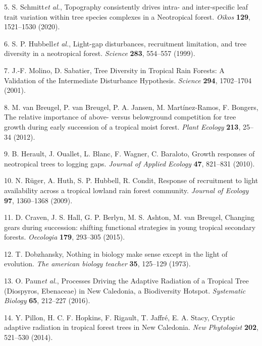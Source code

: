 \documentclass[
]{article}
\begin{document}
\leavevmode\hypertarget{ref-Schmitt2020}{}%
5. S. Schmitt\emph{et al.}, Topography consistently drives intra- and inter-specific leaf trait variation within tree species complexes in a Neotropical forest. \emph{Oikos} \textbf{129}, 1521--1530 (2020).

\leavevmode\hypertarget{ref-Hubbell1999}{}%
6. S. P. Hubbell\emph{et al.}, Light-gap disturbances, recruitment limitation, and tree diversity in a neotropical forest. \emph{Science} \textbf{283}, 554--557 (1999).

\leavevmode\hypertarget{ref-Molino2001}{}%
7. J.-F. Molino, D. Sabatier, Tree Diversity in Tropical Rain Forests: A Validation of the Intermediate Disturbance Hypothesis. \emph{Science} \textbf{294}, 1702--1704 (2001).

\leavevmode\hypertarget{ref-VanBreugel2012}{}%
8. M. van Breugel, P. van Breugel, P. A. Jansen, M. Martínez-Ramos, F. Bongers, The relative importance of above- versus belowground competition for tree growth during early succession of a tropical moist forest. \emph{Plant Ecology} \textbf{213}, 25--34 (2012).

\leavevmode\hypertarget{ref-Herault2010}{}%
9. B. Herault, J. Ouallet, L. Blanc, F. Wagner, C. Baraloto, Growth responses of neotropical trees to logging gaps. \emph{Journal of Applied Ecology} \textbf{47}, 821--831 (2010).

\leavevmode\hypertarget{ref-Ruger2009}{}%
10. N. Rüger, A. Huth, S. P. Hubbell, R. Condit, Response of recruitment to light availability across a tropical lowland rain forest community. \emph{Journal of Ecology} \textbf{97}, 1360--1368 (2009).

\leavevmode\hypertarget{ref-Craven2015}{}%
11. D. Craven, J. S. Hall, G. P. Berlyn, M. S. Ashton, M. van Breugel, Changing gears during succession: shifting functional strategies in young tropical secondary forests. \emph{Oecologia} \textbf{179}, 293--305 (2015).

\leavevmode\hypertarget{ref-Dobzhansky1973}{}%
12. T. Dobzhansky, Nothing in biology make sense except in the light of evolution. \emph{The american biology teacher} \textbf{35}, 125--129 (1973).

\leavevmode\hypertarget{ref-Paun2016}{}%
13. O. Paun\emph{et al.}, Processes Driving the Adaptive Radiation of a Tropical Tree (Diospyros, Ebenaceae) in New Caledonia, a Biodiversity Hotspot. \emph{Systematic Biology} \textbf{65}, 212--227 (2016).

\leavevmode\hypertarget{ref-Pillon2014}{}%
14. Y. Pillon, H. C. F. Hopkins, F. Rigault, T. Jaffré, E. A. Stacy, Cryptic adaptive radiation in tropical forest trees in New Caledonia. \emph{New Phytologist} \textbf{202}, 521--530 (2014).
\end{document}
